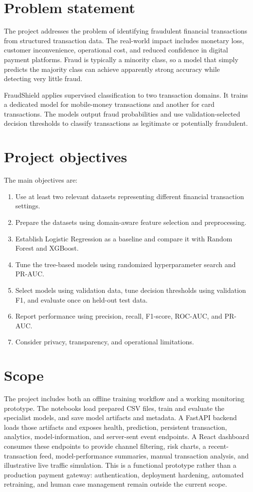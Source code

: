 \documentclass[12pt,a4paper]{report}
\begin{document}
\section{Problem statement}
The project addresses the problem of identifying fraudulent financial transactions from structured transaction data. The real-world impact includes monetary loss, customer inconvenience, operational cost, and reduced confidence in digital payment platforms. Fraud is typically a minority class, so a model that simply predicts the majority class can achieve apparently strong accuracy while detecting very little fraud.

FraudShield applies supervised classification to two transaction domains. It trains a dedicated model for mobile-money transactions and another for card transactions. The models output fraud probabilities and use validation-selected decision thresholds to classify transactions as legitimate or potentially fraudulent.

\section{Project objectives}
The main objectives are:
\begin{enumerate}
  \item Use at least two relevant datasets representing different financial transaction settings.
  \item Prepare the datasets using domain-aware feature selection and preprocessing.
  \item Establish Logistic Regression as a baseline and compare it with Random Forest and XGBoost.
  \item Tune the tree-based models using randomized hyperparameter search and PR-AUC.
  \item Select models using validation data, tune decision thresholds using validation F1, and evaluate once on held-out test data.
  \item Report performance using precision, recall, F1-score, ROC-AUC, and PR-AUC.
  \item Consider privacy, transparency, and operational limitations.
\end{enumerate}

\section{Scope}
The project includes both an offline training workflow and a working monitoring prototype. The notebooks load prepared CSV files, train and evaluate the specialist models, and save model artifacts and metadata. A FastAPI backend loads those artifacts and exposes health, prediction, persistent transaction, analytics, model-information, and server-sent event endpoints. A React dashboard consumes these endpoints to provide channel filtering, risk charts, a recent-transaction feed, model-performance summaries, manual transaction analysis, and illustrative live traffic simulation. This is a functional prototype rather than a production payment gateway: authentication, deployment hardening, automated retraining, and human case management remain outside the current scope.
\end{document}
